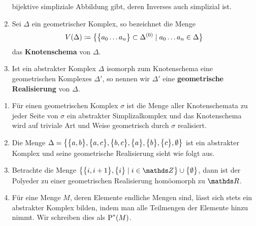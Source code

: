 \begin{Def}
\begin{enumerate}[({A}1)]
    bijektive simpliziale Abbildung gibt, deren Inverses auch
    simplizial ist.
  \item Sei $\Delta$ ein geometrischer Komplex, so bezeichnet die Menge
    \begin{gather*}
      V(\Delta) \coloneqq \bigl\{  \bigl\{ a_0 \ldots a_n \bigr\} \subset
        \Delta^{(0)}  \; | \;  a_0 \ldots a_n \in \Delta \bigr\}
    \end{gather*}
    das \textbf{Knotenschema} von $\Delta$.
  \item Ist ein abstrakter Komplex $\Delta$ isomorph zum Knotenschema
    eine geometrischen Komplexes $\Delta'$, so nennen wir $\Delta'$
    eine \textbf{geometrische Realisierung} von $\Delta$.
  \end{enumerate}
\end{Def}

\begin{Bsp}
  \begin{enumerate}[\textbullet]
  \item Für einen geometrischen Komplex $\sigma$ ist die Menge aller
    Knotenschemata zu jeder Seite von $\sigma$ ein abstrakter
    Simplizalkomplex und das Knotenschema wird auf triviale Art und
    Weise geometrisch durch $\sigma$ realisiert.
  \item Die Menge $\Delta = \sset{%
      \sset{a,b},\sset{a,c},%
      \sset{b,c},\sset{a},\sset{b},\sset{c},\emptyset}$
    ist ein abstrakter Komplex und seine geometrische Realisierung
    sieht wie folgt aus.
    \begin{center}
    \end{center}

  \item Betrachte die Menge
    $\set{ \sset{i,i+1} , \sset{i} }{ i \in \Z} \cup \sset{\emptyset}$,
    dann ist der Polyeder zu einer geometrischen Realisierung
    homöomorph zu $\R$.

  \item Für eine Menge $M$, deren Elemente endliche Mengen sind, lässt
    sich stets ein abstrakter Komplex bilden, indem man alle
    Teilmengen der Elemente hinzu nimmt. Wir schreiben dies als
    $\operatorname{P}^*(M)$.


\end{enumerate}
\end{Bsp}

